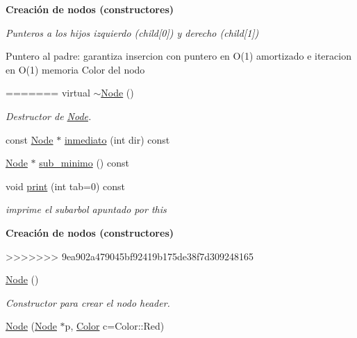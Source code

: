 \begin{Indent}{\bf \-Creación de nodos (constructores)}\par
{\em \-Punteros a los hijos izquierdo (child\mbox{[}0\mbox{]}) y derecho (child\mbox{[}1\mbox{]})

\-Puntero al padre\-: garantiza insercion con puntero en \-O(1) amortizado e iteracion en \-O(1) memoria \-Color del nodo }\begin{DoxyCompactItemize}
=======
virtual \hyperlink{structaed2_1_1map_1_1Node_a4f3cb2cc4302fe96432e624ced147540_a4f3cb2cc4302fe96432e624ced147540}{$\sim$\+Node} ()
\begin{DoxyCompactList}\small\item\em Destructor de \hyperlink{structaed2_1_1map_1_1Node}{Node}. \end{DoxyCompactList}\item 
const \hyperlink{structaed2_1_1map_1_1Node}{Node} $\ast$ \hyperlink{structaed2_1_1map_1_1Node_af812885685c8c3285136d444d5169b28_af812885685c8c3285136d444d5169b28}{inmediato} (int dir) const
\item 
\hyperlink{structaed2_1_1map_1_1Node}{Node} $\ast$ \hyperlink{structaed2_1_1map_1_1Node_a0457bc1ad6576f02057d9e9996cc3e5d_a0457bc1ad6576f02057d9e9996cc3e5d}{sub\+\_\+minimo} () const
\item 
void \hyperlink{structaed2_1_1map_1_1Node_a26f1400bc53e5ac9a5b3ad6250a4f832_a26f1400bc53e5ac9a5b3ad6250a4f832}{print} (int tab=0) const
\begin{DoxyCompactList}\small\item\em imprime el subarbol apuntado por this \end{DoxyCompactList}\end{DoxyCompactItemize}
\begin{Indent}\textbf{ Creación de nodos (constructores)}\par
\begin{DoxyCompactItemize}
>>>>>>> 9ea902a479045bf92419b175de38f7d309248165
\item 
\hyperlink{structaed2_1_1map_1_1Node_a9c1a600491066ce7eb669b1cb76d56c6_a9c1a600491066ce7eb669b1cb76d56c6}{\-Node} ()
\begin{DoxyCompactList}\small\item\em \-Constructor para crear el nodo header. \end{DoxyCompactList}\item 
\hyperlink{structaed2_1_1map_1_1Node_a62b5a42e88e219d53af8237a9ebedb6e_a62b5a42e88e219d53af8237a9ebedb6e}{\-Node} (\hyperlink{structaed2_1_1map_1_1Node}{\-Node} $\ast$p, \hyperlink{classaed2_1_1map_a6d62a415a4b9d320b30cada4ebcf9f5b_a6d62a415a4b9d320b30cada4ebcf9f5b}{\-Color} c=\-Color\-::\-Red)

\end{DoxyCompactItemize}
\end{Indent}
\end{Indent}
